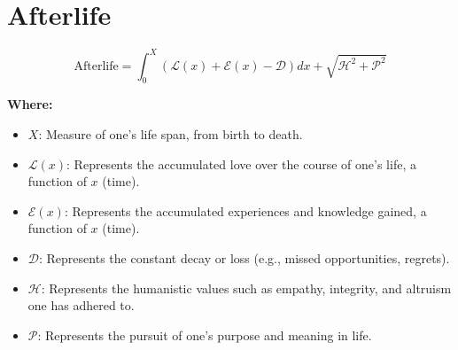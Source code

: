 \chapter{Afterlife}

\begin{equation}
\text{Afterlife} = \int_{0}^{X} (\mathcal{L}(x) + \mathcal{E}(x) - \mathcal{D})dx + \sqrt{\mathcal{H}^2 + \mathcal{P}^2}
\end{equation}

\textbf{Where:}

\begin{itemize}
    \item $X$: Measure of one's life span, from birth to death.
    \item $\mathcal{L}(x)$: Represents the accumulated love over the course of one's life, a function of $x$ (time).
    \item $\mathcal{E}(x)$: Represents the accumulated experiences and knowledge gained, a function of $x$ (time).
    \item $\mathcal{D}$: Represents the constant decay or loss (e.g., missed opportunities, regrets).
    \item $\mathcal{H}$: Represents the humanistic values such as empathy, integrity, and altruism one has adhered to.
    \item $\mathcal{P}$: Represents the pursuit of one’s purpose and meaning in life.
\end{itemize}
